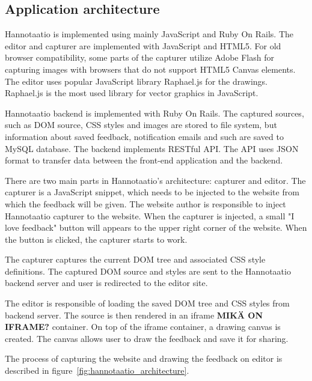 \documentclass[english,12pt,a4paper,pdftex]{article}
\begin{document}
\subsection{Application architecture}

Hannotaatio is implemented using mainly JavaScript and Ruby On Rails. The editor and capturer are implemented with JavaScript and HTML5. For old browser compatibility, some parts of the capturer utilize Adobe Flash for capturing images with browsers that do not support HTML5 Canvas elements. The editor uses popular JavaScript library Raphael.js for the drawings. Raphael.js is the most used library for vector graphics in JavaScript.

Hannotaatio backend is implemented with Ruby On Rails. The captured sources, such as \ac{DOM} source, \ac{CSS} styles and images are stored to file system, but information about saved feedback, notification emails and such are saved to MySQL database. The backend implements RESTful \ac{API}. The \ac{API} uses JSON format to transfer data between the front-end application and the backend.

There are two main parts in Hannotaatio's architecture: capturer and editor. The capturer is a JavaScript snippet, which needs to be injected to the website from which the feedback will be given. The website author is responsible to inject Hannotaatio capturer to the website. When the capturer is injected, a small "I love feedback" button will appears to the upper right corner of the website. When the button is clicked, the capturer starts to work. 

The capturer captures the current \ac{DOM} tree and associated \ac{CSS} style definitions. The captured \ac{DOM} source and styles are sent to the Hannotaatio backend server and user is redirected to the editor site.

The editor is responsible of loading the saved \ac{DOM} tree and \ac{CSS} styles from backend server. The source is then rendered in an iframe \textbf{MIKÄ ON IFRAME?} container. On top of the iframe container, a drawing canvas is created. The canvas allows user to draw the feedback and save it for sharing.

The process of capturing the website and drawing the feedback on editor is described in figure~\ref{fig:hannotaatio_architecture}.
\end{document}
